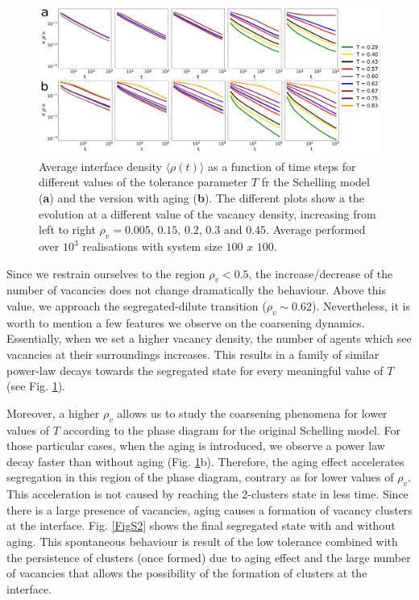 \begin{figure}[ht]
    \centering
    \includegraphics[width=\linewidth]{Figs/Appendix_Schelling/FigS3_1.png} 
    \caption[Average interface density $ \langle \rho (t) \rangle$ for different $\rho_v$]{ Average interface density $ \langle \rho (t) \rangle$ as a function of time steps for different values of the tolerance parameter $T$ fr the Schelling model (\textbf{a}) and the version with aging (\textbf{b}). The different plots show a the evolution at a different value of the vacancy density, increasing from left to right $\rho_v = 0.005$, $0.15$, $0.2$, $0.3$ and $0.45$. Average performed over $10^{3}$ realisations with system size $100$ $x$ $100$.}
    \label{FigS1}
    \end{figure}
Since we restrain ourselves to the region $\rho_{v} < 0.5$, the increase/decrease of the number of vacancies does not change dramatically the behaviour. Above this value, we approach the segregated-dilute transition ($\rho_v \sim 0.62$). Nevertheless, it is worth to mention a few features we observe on the coarsening dynamics. Essentially, when we  set a higher vacancy density, the number of agents which see vacancies at their surroundings increases. This results in a family of similar power-law decays towards the segregated state for every meaningful value of $T$ (see Fig. \ref{FigS1}). 

Moreover, a higher $\rho_v$ allows us to study the coarsening phenomena for lower values of $T$ according to the phase diagram for the original Schelling model. For those particular cases, when the aging is introduced, we observe a power law decay faster than without aging (Fig. \ref{FigS1}b). Therefore, the aging effect accelerates segregation in this region of the phase diagram, contrary as for lower values of $\rho_v$. This acceleration is not caused by reaching the 2-clusters state in less time. Since there is a large presence of vacancies, aging causes a formation of vacancy clusters at the interface. Fig. \ref{FigS2} shows the final segregated state with and without aging. This spontaneous behaviour is result of the low tolerance combined with the persistence of clusters (once formed) due to aging effect and the large number of vacancies that allows the possibility of the formation of clusters at the interface.

